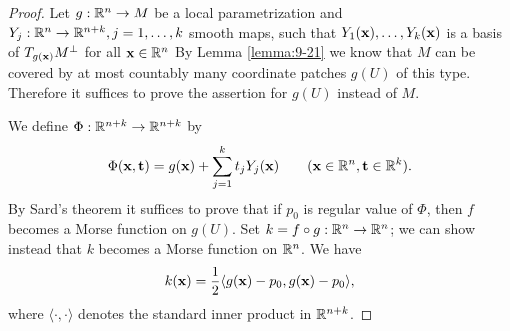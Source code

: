 \begin{proof}
  Let $g:{\mathbb{R}}^n\to M$ be a local parametrization and $Y_j:{\mathbb{R}}^n\to{\ensuremath{\mathbb{R}}}^{n+k},j=1,\ldots,k$ smooth maps, such 
  that $Y_1(\mathbf{x}), \ldots, Y_k(\mathbf{x})$ is a basis of $T_{g(\mathbf{x})}M^\perp$ for all $\mathbf{x}\in{\ensuremath{\mathbb{R}}}^n$ By Lemma \ref{lemma:9-21} we know that $M$ 
  can be covered by at most countably many coordinate patches $g(U)$ of this type. Therefore it suffices to prove the
  assertion for $g(U)$ instead of $M$.

  We define $\Phi:{\mathbb{R}}^{n+k}\to{\ensuremath{\mathbb{R}}}^{n+k}$ by 
  \begin{align}\label{eq:12-4}
    \Phi(\mathbf{x}, \mathbf{t}) = g(\mathbf{x}) + \sum_{j=1}^k{t_jY_j(\mathbf{x})}\qquad (\mathbf{x}\in{\ensuremath{\mathbb{R}}}^n, \mathbf{t}\in{\ensuremath{\mathbb{R}}}^k). 
  \end{align}
  By Sard's theorem it suffices to prove that if $p_0$ is regular value of $\Phi$, then $f$ becomes 
  a Morse function on $g(U)$. Set $k=f\circ g:{\mathbb{R}}^n\to{\ensuremath{\mathbb{R}}}^n$; we can show instead that $k$ becomes 
  a Morse function on ${\mathbb{R}}^n$. We have 
  \begin{align}\label{eq:12-5}
    k(\mathbf{x}) = \frac12\langle g(\mathbf{x})-p_0, g(\mathbf{x})-p_0\rangle,
  \end{align}
  where $\langle\cdot,\cdot\rangle$ denotes the standard inner product in ${\mathbb{R}}^{n+k}$. 


\end{proof}
